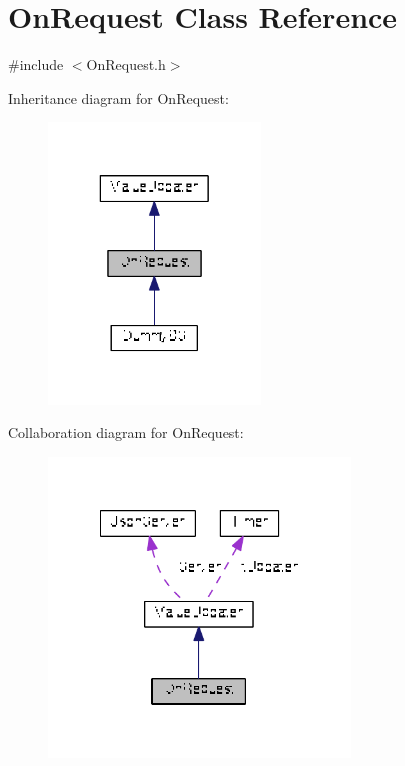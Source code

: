 \hypertarget{class_on_request}{\section{On\+Request Class Reference}
\label{class_on_request}
}


{\ttfamily \#include $<$On\+Request.\+h$>$}



Inheritance diagram for On\+Request\+:\nopagebreak
\begin{figure}[H]
\begin{center}
\leavevmode
\includegraphics[width=160pt]{class_on_request__inherit__graph}
\end{center}
\end{figure}


Collaboration diagram for On\+Request\+:\nopagebreak
\begin{figure}[H]
\begin{center}
\leavevmode
\includegraphics[width=227pt]{class_on_request__coll__graph}
\end{center}
\end{figure}
